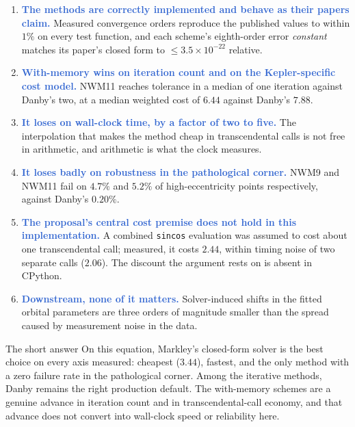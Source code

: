 \documentclass[11pt,a4paper]{article}
\newcommand{\key}[1]{\textcolor{Highlight}{\bfseries #1}}
\begin{document}
\begin{enumerate}
  \item \key{The methods are correctly implemented and behave as their
        papers claim.} Measured convergence orders reproduce the published
        values to within $1\%$ on every test function, and each scheme's eighth-order error
        \emph{constant} matches its paper's closed form to
        $\leq 3.5\times10^{-22}$ relative.
  \item \key{With-memory wins on iteration count and on the
        Kepler-specific cost model.} NWM11 reaches tolerance in a median
        of one iteration against Danby's two, at a median weighted cost of
        $6.44$ against Danby's $7.88$.
  \item \key{It loses on wall-clock time, by a factor of two to five.}
        The interpolation that makes the method cheap in transcendental
        calls is not free in arithmetic, and arithmetic is what the clock
        measures.
  \item \key{It loses badly on robustness in the pathological corner.}
        NWM9 and NWM11 fail on $4.7\%$ and $5.2\%$ of high-eccentricity
        points respectively, against Danby's $0.20\%$.
  \item \key{The proposal's central cost premise does not hold in this
        implementation.} A combined \texttt{sincos} evaluation was assumed
        to cost about one transcendental call; measured, it costs
        $2.44$, within timing noise of two separate calls ($2.06$). The discount the argument rests on is absent in CPython.
  \item \key{Downstream, none of it matters.} Solver-induced shifts in the
        fitted orbital parameters are three orders of magnitude smaller
        than the spread caused by measurement noise in the data.
\end{enumerate}

\begin{finding}{The short answer}
On this equation, Markley's closed-form solver is the best choice on every
axis measured: cheapest ($3.44$), fastest, and the only method with a
zero failure rate in the pathological corner. Among the iterative methods,
Danby remains the right production default. The with-memory schemes are a
genuine advance in iteration count and in transcendental-call economy, and
that advance does not convert into wall-clock speed or reliability here.
\end{finding}

\end{document}
